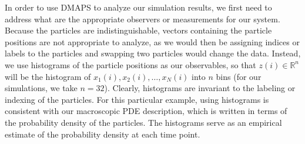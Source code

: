\documentclass[prl, reprint, final, showkeys]{revtex4-1}
\begin{document}
In order to use DMAPS to analyze our simulation results, we first need to address what are the appropriate observers or measurements for our system.
%
Because the particles are indistinguishable, vectors containing the particle positions are not appropriate to analyze, as we would then be assigning indices or labels to the particles and swapping two particles would change the data.
%
Instead, we use histograms of the particle positions as our observables, so that $z(i) \in \mathbb{R}^n$ will be the histogram of $x_1(i), x_2(i), \dots, x_N(i)$ into $n$ bins (for our simulations, we take $n=32$).
%
Clearly, histograms are invariant to the labeling or indexing of the particles.
%
For this particular example, using histograms is consistent with our macroscopic PDE description, which is written in terms of the probability density of the particles.
%
The histograms serve as an empirical estimate of the probability density at each time point.

\end{document}

